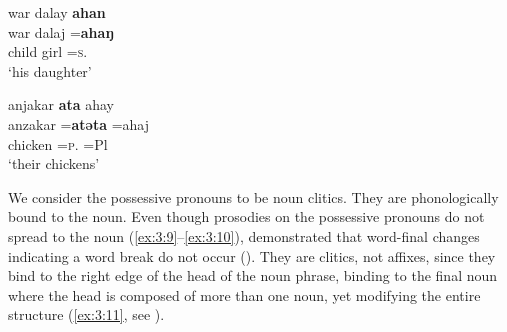 \ea \label{ex:3:11}
war   dalay  \textbf{ahan}\\
\gll  war     dalaj    =\textbf{ahaŋ}\\
      child  girl  =\textsc{s}.{\POSS}\\
\glt  ‘his daughter’
\z

\ea \label{ex:3:12}
anjakar  \textbf{ata}  ahay\\
\gll  anzakar   =\textbf{atəta}     =ahaj\\
      chicken  =\textsc{p}.{\POSS}  =Pl\\
\glt  `their chickens’
\z

We consider the possessive pronouns to be noun clitics. They are phonologically bound to the noun. Even though prosodies on the possessive pronouns do not spread to the noun (\ref{ex:3:9}--\ref{ex:3:10}), \citet{Bow1997c} demonstrated that word-final changes indicating a word break do not occur (). They are clitics, not affixes, since they bind to the right edge of the head of the noun phrase, binding to the final noun where the head is composed of more than one noun, yet modifying the entire structure (\ref{ex:3:11}, see ).

\begin{table}
\caption{Possessive cliticising to nouns with word-final /h/\label{tab:3.16}}
\end{table}

